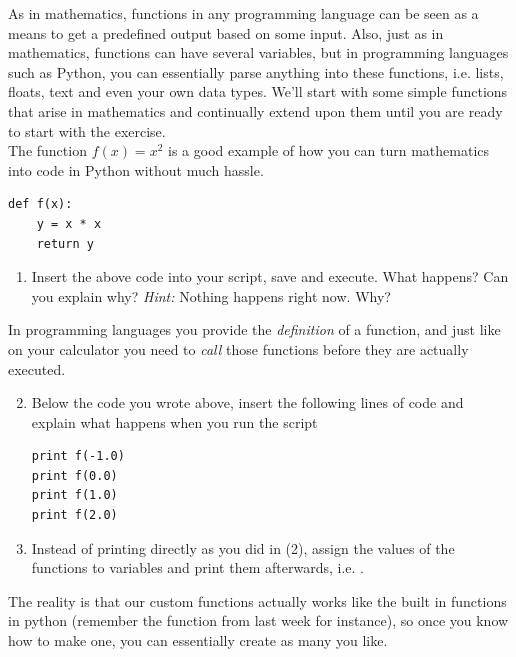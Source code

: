 \documentclass{article}
\begin{document}
As in mathematics, functions in any programming language can be seen as a
means to get a predefined output based on some input. Also, just as in
mathematics, functions can have several variables, but in programming languages
such as Python, you can essentially parse anything into these
functions, i.e. lists, floats, text and even your own data types. We'll start with some simple functions that arise in mathematics and
continually extend upon them until you are ready to start with the exercise.\\

The function $f(x)=x^2$ is a good example of how you can turn mathematics into code in Python without much hassle.

\begin{lstlisting}
def f(x):
    y = x * x
    return y
\end{lstlisting}


\begin{enumerate}
  \item Insert the above code into your script, save and execute. What
      happens? Can you explain why? {\em Hint:} Nothing happens right now. Why?
\end{enumerate}

In programming languages you provide the {\em definition} of a function, and
just like on your calculator you need to {\em call} those functions before they
are actually executed.

\begin{enumerate}
  \setcounter{enumi}{1}
  \item Below the code you wrote above, insert the following lines of code and
    explain what happens when you run the script

\begin{lstlisting}
print f(-1.0)
print f(0.0)
print f(1.0)
print f(2.0)
\end{lstlisting}

  \item Instead of printing directly as you did in (2), assign the values of
    the functions to variables and print them afterwards, i.e. .

\end{enumerate}

The reality is that our custom functions actually works like the built in
functions in python (remember the  function from last week for instance), 
so once you know how to make one, you can essentially create as many you like.\\
\end{document}
